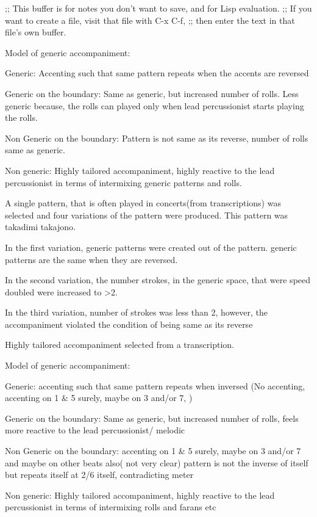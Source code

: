 ;; This buffer is for notes you don't want to save, and for Lisp evaluation.
;; If you want to create a file, visit that file with C-x C-f,
;; then enter the text in that file's own buffer.



Model of generic accompaniment:

Generic: Accenting such that same pattern repeats when the accents are reversed 

Generic on the boundary: Same as generic, but increased number of rolls. Less generic because, the rolls can played only when lead percussionist starts playing the rolls.

Non Generic on the boundary: Pattern is not same as its reverse, number of rolls same as generic. 

Non generic: Highly tailored accompaniment, highly reactive to the lead percussionist in terms of intermixing generic patterns and rolls.

A single pattern, that is often played in concerts(from transcriptions) was selected and four variations of the pattern were produced. This pattern was takadimi takajono. 

In the first variation, generic patterns were created out of the pattern. generic patterns are the same when they are reversed.

In the second variation, the number strokes, in the generic space, that were speed doubled were increased to >2.  

In the third variation, number of strokes was less than 2, however, the accompaniment violated the condition of being same as its reverse

Highly tailored accompaniment selected from a transcription.



Model of generic accompaniment:

Generic: accenting such that same pattern repeats when inversed (No accenting, accenting on 1 & 5 surely, maybe on 3 and/or 7, )

Generic on the boundary: Same as generic, but increased number of rolls, feels more reactive to the lead percussionist/ melodic

Non Generic on the boundary: 
    accenting on 1 & 5 surely, maybe on 3 and/or 7 and maybe on other beats also( not very clear)
    pattern is not the inverse of itself but repeats itself at 2/6 itself, contradicting meter

Non generic: Highly tailored accompaniment, highly reactive to the lead percussionist in terms of intermixing rolls and farans etc

